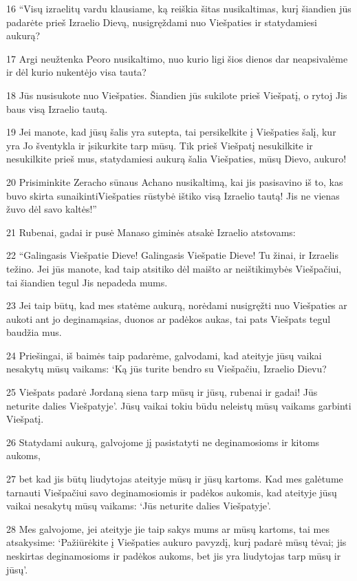 \par 16 “Visų izraelitų vardu klausiame, ką reiškia šitas nusikaltimas, kurį šiandien jūs padarėte prieš Izraelio Dievą, nusigręždami nuo Viešpaties ir statydamiesi aukurą? 
\par 17 Argi neužtenka Peoro nusikaltimo, nuo kurio ligi šios dienos dar neapsivalėme ir dėl kurio nukentėjo visa tauta? 
\par 18 Jūs nusisukote nuo Viešpaties. Šiandien jūs sukilote prieš Viešpatį, o rytoj Jis baus visą Izraelio tautą. 
\par 19 Jei manote, kad jūsų šalis yra sutepta, tai persikelkite į Viešpaties šalį, kur yra Jo šventykla ir įsikurkite tarp mūsų. Tik prieš Viešpatį nesukilkite ir nesukilkite prieš mus, statydamiesi aukurą šalia Viešpaties, mūsų Dievo, aukuro! 
\par 20 Prisiminkite Zeracho sūnaus Achano nusikaltimą, kai jis pasisavino iš to, kas buvo skirta sunaikinti­Viešpaties rūstybė ištiko visą Izraelio tautą! Jis ne vienas žuvo dėl savo kaltės!” 
\par 21 Rubenai, gadai ir pusė Manaso giminės atsakė Izraelio atstovams: 
\par 22 “Galingasis Viešpatie Dieve! Galingasis Viešpatie Dieve! Tu žinai, ir Izraelis težino. Jei jūs manote, kad taip atsitiko dėl maišto ar neištikimybės Viešpačiui, tai šiandien tegul Jis nepadeda mums. 
\par 23 Jei taip būtų, kad mes statėme aukurą, norėdami nusigręžti nuo Viešpaties ar aukoti ant jo deginamąsias, duonos ar padėkos aukas, tai pats Viešpats tegul baudžia mus. 
\par 24 Priešingai, iš baimės taip padarėme, galvodami, kad ateityje jūsų vaikai nesakytų mūsų vaikams: ‘Ką jūs turite bendro su Viešpačiu, Izraelio Dievu? 
\par 25 Viešpats padarė Jordaną siena tarp mūsų ir jūsų, rubenai ir gadai! Jūs neturite dalies Viešpatyje’. Jūsų vaikai tokiu būdu neleistų mūsų vaikams garbinti Viešpatį. 
\par 26 Statydami aukurą, galvojome jį pasistatyti ne deginamosioms ir kitoms aukoms, 
\par 27 bet kad jis būtų liudytojas ateityje mūsų ir jūsų kartoms. Kad mes galėtume tarnauti Viešpačiui savo deginamosiomis ir padėkos aukomis, kad ateityje jūsų vaikai nesakytų mūsų vaikams: ‘Jūs neturite dalies Viešpatyje’. 
\par 28 Mes galvojome, jei ateityje jie taip sakys mums ar mūsų kartoms, tai mes atsakysime: ‘Pažiūrėkite į Viešpaties aukuro pavyzdį, kurį padarė mūsų tėvai; jis neskirtas deginamosioms ir padėkos aukoms, bet jis yra liudytojas tarp mūsų ir jūsų’. 

